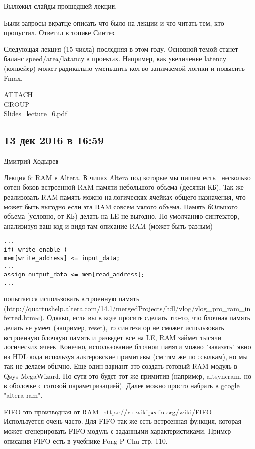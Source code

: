 \documentclass[a4paper, 12pt]{extarticle}
\begin{document}
Выложил слайды прошедшей лекции.

Были запросы вкратце описать что было на лекции и что читать тем, кто пропустил. Ответил в топике Синтез.

Следующая лекция (15 числа) последняя в этом году. Основной темой станет баланс speed/area/latancy в проектах. Например, как увеличение latency (конвейер) может радикально уменьшить кол-во занимаемой логики и повысить Fmax.

ATTACH\\GROUP\\Slides_lecture_6.pdf


\subsection{13 дек 2016 в 16:59}

Дмитрий Ходырев

Лекция 6: RAM в Altera. В чипах Altera под которые мы пишем есть ~несколько сотен боков встроенной RAM памяти небольшого объема (десятки КБ). Так же реализовать RAM память можно на логических ячейках общего назначения, что может быть выгодно если эта RAM совсем малого объема. Память бОльшого объема (условно, от КБ) делать на LE не выгодно. По умолчанию синтезатор, анализируя ваш код и видя там описание RAM (может быть разным)
\begin{verbatim}
...
if( write_enable )
mem[write_address] <= input_data;
...
assign output_data <= mem[read_address];
...
\end{verbatim}

попытается использовать встроенную память (http://quartushelp.altera.com/14.1/mergedProjects/hdl/vlog/vlog_pro_ram_inferred.htmы). Однако, если вы в коде просите сделать что-то, что блочная память делать не умеет (например, reset), то синтезатор не сможет использовать встроенную блочную память и разведет все на LE, RAM займет тысячи логических ячеек. Конечно, использование блочной памяти можно "заказать" явно из HDL кода используя альтеровские примитивы (см там же по ссылкам), но мы так не делаем обычно. Еще один вариант это создать готовый RAM модуль в Qsys MegaWizard. По сути это будет тот же примитив (например, altsyncram, но в оболочке с готовой параметризацией).
Далее можно просто набрать в google "altera ram".

FIFO это производная от RAM. https://ru.wikipedia.org/wiki/FIFO
Используется очень часто. Для FIFO так же есть встроенная функция, которая может сгенерировать FIFO-модуль с заданными характеристиками. Пример описания FIFO есть в учебнике Pong P Chu стр. 110.
\end{document}
